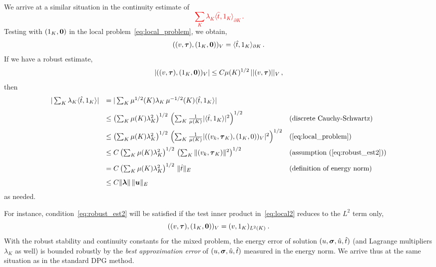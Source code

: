 \documentclass[letterpaper]{article}
\def\bftau{\boldsymbol\tau}
\newcommand{\norm}[1]{\left\| #1 \right\|}
\newcommand{\ptl}{{\partial}}
\newcommand{\bfsig}{\mbox{\boldmath $\sigma$}}
\newcommand{\bfu}{\boldsymbol u}
\newcommand{\bflambda}{\boldsymbol\lambda}
\newcommand{\red}[1]{\textcolor{red}{#1}}
\begin{document}
We arrive at a similar situation in the continuity estimate of
\red{
$$
\sum_K \lambda_K \langle \hat{t}, 1_K \rangle_{\partial K}\,.
$$
}
Testing with $(1_K,{\bf 0})$ in the local problem~\eqref{eq:local_problem}, we obtain,
\begin{equation}
((v,\bftau),(1_K,{\bf 0}))_V = \langle \hat{t}, 1_K \rangle_{\ptl K}\,.
\label{eq:local2}
\end{equation}
If we have a robust estimate,
\begin{equation}
| ((v,\bftau),(1_K,{\bf 0}))_V | \leq C \mu(K)^{1/2} \, || (v,\bftau) ||_V\,,
\label{eq:robust_est2}
\end{equation}
then
\red{
\begin{equation}
\begin{array}{lll}
\vert  \sum_K \lambda_K \langle \hat{t}, 1_K \rangle  \vert 
& = \vert  \sum_K \mu^{1/2}(K) \lambda_K \, \mu^{-1/2}(K) \langle \hat{t}, 1_K \rangle  \vert \\[8pt]
& \leq \left( \sum_K \mu(K) \lambda_K^2 \right)^{1/2}\, 
\left( \sum_K \frac{1}{\mu(K)} \vert \langle \hat{t},1_K \rangle \vert^2 \right)^{1/2}
& \text{(discrete Cauchy-Schwartz)} \\[8pt]
& \leq \left( \sum_K \mu(K) \lambda_K^2 \right)^{1/2}\, 
\left( \sum_K \frac{1}{\mu(K)} \vert ((v_k,\bftau_K),(1_K,0))_V \vert^2 \right)^{1/2}
& \text{(\ref{eq:local_problem})} \\[8pt]
& \leq C \left( \sum_K \mu(K) \lambda_K^2 \right)^{1/2}\, 
\left( \sum_K  \Vert (v_k,\bftau_K) \Vert^2 \right)^{1/2}
& \text{(assumption (\ref{eq:robust_est2}))} \\[8pt]
& = C  \left( \sum_K \mu(K) \lambda_K^2 \right)^{1/2}\, 
 \Vert \hat{t} \Vert_E
& \text{(definition of energy norm)} \\[8pt]
& \le C \Vert \bflambda \Vert \, \Vert \bfu \Vert_E 
\end{array}
\end{equation}
}
as needed.

For instance, condition~\eqref{eq:robust_est2} will be satisfied if the test inner product
in~\eqref{eq:local2} reduces to the $L^2$ term only,
\begin{equation}
((v,\bftau),(1_K,{\bf 0}))_V = (v,1_K)_{L^2(K)} \: .
\end{equation}
With the robust stability and continuity constants for the mixed problem, the energy error
of solution $(u,\bfsig,\hat{u},\hat{t})$ (and Lagrange multipliers $\lambda_K$ as well)
is bounded robustly by the {\em best approximation error} of  $(u,\bfsig,\hat{u},\hat{t})$
measured in the energy norm. We arrive thus at the same situation as in the standard
DPG method.
\end{document}
